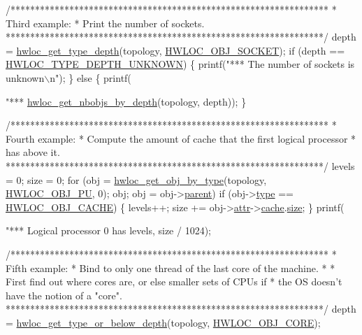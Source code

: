\begin{DoxyCodeInclude}
{{{    \textcolor{comment}{/*****************************************************************}
\textcolor{comment}{     * Third example:}
\textcolor{comment}{     * Print the number of sockets.}
\textcolor{comment}{     *****************************************************************/}
    depth = \hyperlink{a00046_gaea7c64dd59467f5201ba87712710b14d}{hwloc_get_type_depth}(topology, \hyperlink{a00041_ggacd37bb612667dc437d66bfb175a8dc55a1ac6e07775ae4324b3fe9dbd72c785ec}{HWLOC_OBJ_SOCKET});
    \textcolor{keywordflow}{if} (depth == \hyperlink{a00046_ggaf4e663cf42bbe20756b849c6293ef575a0565ab92ab72cb0cec91e23003294aad}{HWLOC_TYPE_DEPTH_UNKNOWN}) \{
        printf(\textcolor{stringliteral}{"*** The number of sockets is unknown\(\backslash\)n"});
    \} \textcolor{keywordflow}{else} \{
        printf(\textcolor{stringliteral}{"*** %
               \hyperlink{a00046_ga20cfe2456f4cfdd789c9aca6d2fdd69f}{hwloc_get_nbobjs_by_depth}(topology, depth));
    \}

    \textcolor{comment}{/*****************************************************************}
\textcolor{comment}{     * Fourth example:}
\textcolor{comment}{     * Compute the amount of cache that the first logical processor}
\textcolor{comment}{     * has above it.}
\textcolor{comment}{     *****************************************************************/}
    levels = 0;
    size = 0;
    \textcolor{keywordflow}{for} (obj = \hyperlink{a00047_ga9be4a03488cdd0fb431e4aa1cbdea895}{hwloc_get_obj_by_type}(topology, \hyperlink{a00041_ggacd37bb612667dc437d66bfb175a8dc55abca6887e80cb291353b0a0c1da83f661}{HWLOC_OBJ_PU}, 0);
         obj;
         obj = obj->\hyperlink{a00016_adc494f6aed939992be1c55cca5822900}{parent})
      \textcolor{keywordflow}{if} (obj->\hyperlink{a00016_acc4f0803f244867e68fe0036800be5de}{type} == \hyperlink{a00041_ggacd37bb612667dc437d66bfb175a8dc55a56ee0b7eca88f363b75b34fdde8c9ddc}{HWLOC_OBJ_CACHE}) \{
        levels++;
        size += obj->\hyperlink{a00016_accd40e29f71f19e88db62ea3df02adc8}{attr}->\hyperlink{a00017_ab5a8ae3bf490e6b1071fea53f7382836}{cache}.\hyperlink{a00013_abe5e788943ed04302976740c829674c0}{size};
      \}
    printf(\textcolor{stringliteral}{"*** Logical processor 0 has %
           levels, size / 1024);

    \textcolor{comment}{/*****************************************************************}
\textcolor{comment}{     * Fifth example:}
\textcolor{comment}{     * Bind to only one thread of the last core of the machine.}
\textcolor{comment}{     *}
\textcolor{comment}{     * First find out where cores are, or else smaller sets of CPUs if}
\textcolor{comment}{     * the OS doesn't have the notion of a "core".}
\textcolor{comment}{     *****************************************************************/}
    depth = \hyperlink{a00052_ga081be77905201e9f42318e9974456b45}{hwloc_get_type_or_below_depth}(topology, \hyperlink{a00041_ggacd37bb612667dc437d66bfb175a8dc55ac793958f330bca371aa1535de8aff45f}{HWLOC_OBJ_CORE});

}}}}}
\end{DoxyCodeInclude}
